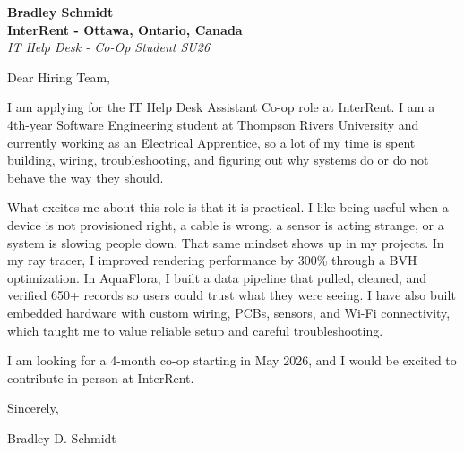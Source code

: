 \documentclass[11pt]{article}
\begin{document}
\textbf{Bradley Schmidt}\\
\vspace{0.5em}
\textbf{InterRent - Ottawa, Ontario, Canada}\\
\textit{IT Help Desk - Co-Op Student SU26}

Dear Hiring Team,

\par

I am applying for the IT Help Desk Assistant Co-op role at InterRent. I am a 4th-year Software Engineering student at Thompson Rivers University and currently working as an Electrical Apprentice, so a lot of my time is spent building, wiring, troubleshooting, and figuring out why systems do or do not behave the way they should.

\par

What excites me about this role is that it is practical. I like being useful when a device is not provisioned right, a cable is wrong, a sensor is acting strange, or a system is slowing people down. That same mindset shows up in my projects. In my ray tracer, I improved rendering performance by 300\% through a BVH optimization. In AquaFlora, I built a data pipeline that pulled, cleaned, and verified 650+ records so users could trust what they were seeing. I have also built embedded hardware with custom wiring, PCBs, sensors, and Wi-Fi connectivity, which taught me to value reliable setup and careful troubleshooting.

\par

I am looking for a 4-month co-op starting in May 2026, and I would be excited to contribute in person at InterRent.

\par

Sincerely,

\par

Bradley D. Schmidt
\end{document}
